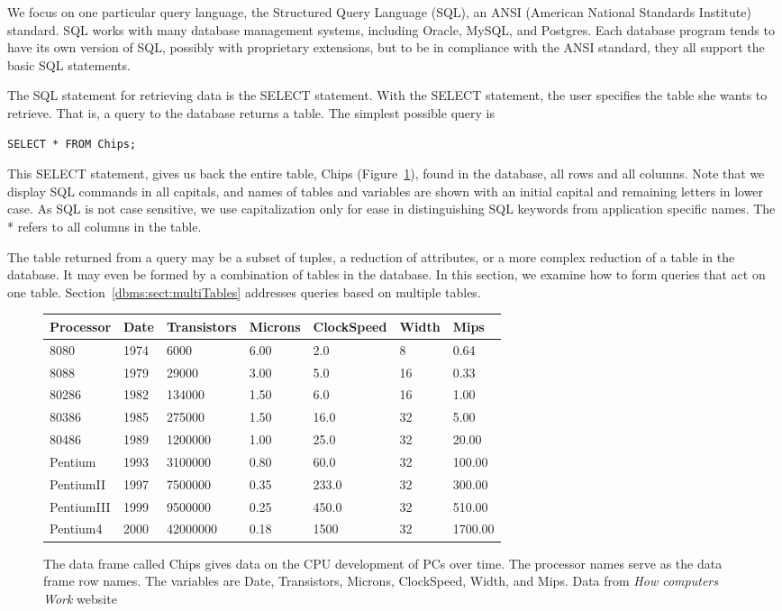 We focus on one particular query language, the Structured Query Language 
(SQL), an ANSI (American National Standards Institute) standard.
SQL works with many database management systems, including Oracle, 
MySQL, and Postgres. 
Each database program tends to have its own version of SQL,
possibly with proprietary extensions, but to be in compliance with the 
ANSI standard, they all support the basic SQL statements.

The SQL statement for retrieving data is the SELECT statement.
With the SELECT statement, the user specifies the table she wants to retrieve.  
That is, a query to the database returns a table. 
The simplest possible query is 
\begin{verbatim}
SELECT * FROM Chips;
\end{verbatim}
This SELECT statement, gives us back the entire table, 
Chips (Figure~\ref{dbms:fig:chips}), found
in the database, all rows and all columns. 
Note that we display SQL commands in all capitals, 
and names of tables and variables are shown with an initial capital
and remaining letters in lower case. 
As SQL is not case sensitive, we use capitalization only for ease 
in distinguishing SQL keywords from application specific names.
The * refers to all columns in the table.

The table returned from a query may be a subset of tuples, a reduction
of attributes, or a more complex reduction of a table in the database. 
It may even be formed by a combination of tables in the database.  
In this section, we examine how to form queries that act on one table. 
Section~\ref{dbms:sect:multiTables} addresses queries based on multiple tables. 

\begin{figure}
\begin{tabular}{l|llllll}
Processor  & Date & Transistors & Microns & ClockSpeed & Width & Mips\\
\hline
8080  &    1974  &     6000 &  6.00 & 2.0 &  8  &  0.64\\
8088  &    1979  &     29000 & 3.00 & 5.0 & 16  &  0.33\\
80286 &    1982 &     134000 &   1.50 &   6.0   &   16  &    1.00\\
80386 &    1985 &     275000 &   1.50 & 16.0   &   32  &    5.00\\
80486  &    1989 &    1200000 &   1.00 &  25.0 &   32  &   20.00\\
Pentium &   1993 &    3100000 &   0.80 &  60.0 &   32  &  100.00\\
PentiumII & 1997 &    7500000 &   0.35 & 233.0 &   32  &  300.00 \\
PentiumIII & 1999 &    9500000 &   0.25 & 450.0  &   32  &  510.00 \\
Pentium4  & 2000  &  42000000  &  0.18  & 1500 &   32  & 1700.00\\
\hline
\end{tabular}
\caption{The data frame called Chips gives data on the CPU development 
of PCs over time. 
The processor names serve as the data frame row names.
The variables are Date, Transistors, Microns, ClockSpeed,
Width, and Mips.
Data from \textit{How computers Work} website}\label{dbms:fig:chips}
\end{figure}

